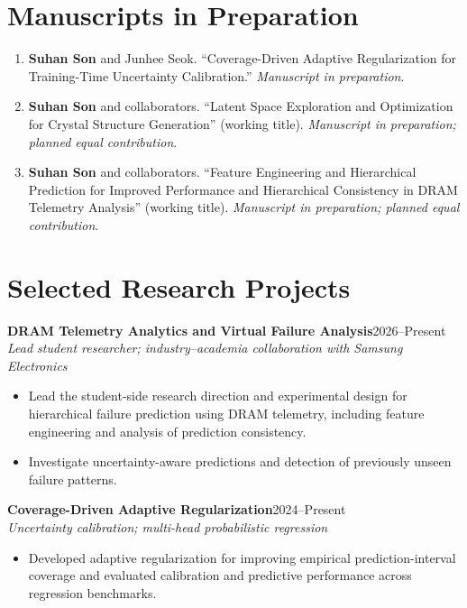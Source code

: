 \documentclass[a4paper,10pt]{article}
\newcommand{\project}[3]{\textbf{#1}\hfill{\small #2}\\[-1pt]{\small\textit{#3}}\par}
\newcommand{\tightgap}{\vspace{5pt}}
\begin{document}
\section{Manuscripts in Preparation}

\begin{enumerate}[leftmargin=1.65em,itemsep=4pt,topsep=0pt]
\item \textbf{Suhan Son} and Junhee Seok.
  ``Coverage-Driven Adaptive Regularization for Training-Time Uncertainty Calibration.''
  \textit{Manuscript in preparation}.
\item \textbf{Suhan Son} and collaborators.
  ``Latent Space Exploration and Optimization for Crystal Structure Generation''
  (working title). \textit{Manuscript in preparation; planned equal contribution}.
\item \textbf{Suhan Son} and collaborators.
  ``Feature Engineering and Hierarchical Prediction for Improved Performance and
  Hierarchical Consistency in DRAM Telemetry Analysis'' (working title).
  \textit{Manuscript in preparation; planned equal contribution}.
\end{enumerate}

\section{Selected Research Projects}

\project{DRAM Telemetry Analytics and Virtual Failure Analysis}
  {2026--Present}
  {Lead student researcher; industry--academia collaboration with Samsung Electronics}

\begin{itemize}
\item Lead the student-side research direction and experimental design for hierarchical failure
  prediction using DRAM telemetry, including feature engineering and analysis of prediction consistency.
\item Investigate uncertainty-aware predictions and detection of previously unseen failure patterns.
\end{itemize}

\tightgap

\project{Coverage-Driven Adaptive Regularization}
  {2024--Present}
  {Uncertainty calibration; multi-head probabilistic regression}

\begin{itemize}
\item Developed adaptive regularization for improving empirical prediction-interval coverage and
  evaluated calibration and predictive performance across regression benchmarks.
\end{itemize}
\end{document}
